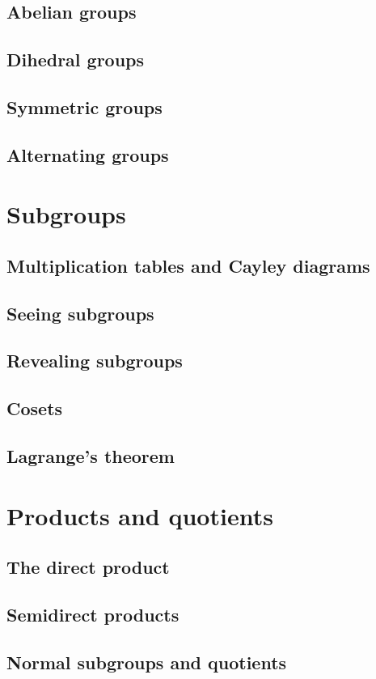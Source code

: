 \subsection{Abelian groups}
\subsection{Dihedral groups}
\subsection{Symmetric groups}
\subsection{Alternating groups}

\section{Subgroups}
\subsection{Multiplication tables and Cayley diagrams}
\subsection{Seeing subgroups}
\subsection{Revealing subgroups}
\subsection{Cosets}
\subsection{Lagrange's theorem}

\section{Products and quotients}
\subsection{The direct product}
\subsection{Semidirect products}
\subsection{Normal subgroups and quotients}
